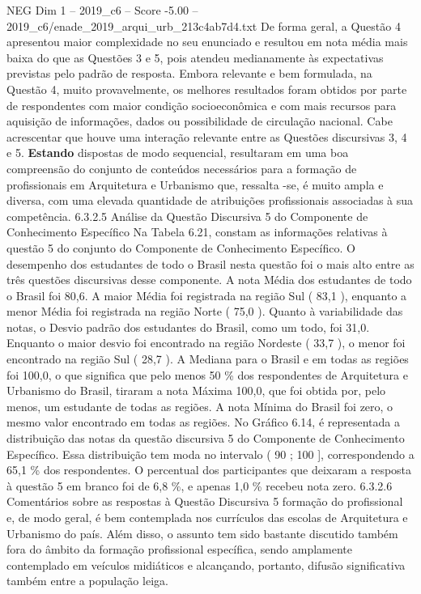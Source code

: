 \begin{textsample}{NEG Dim 1 – 2019\_c6 – Score -5.00 – 2019\_c6/enade\_2019\_arqui\_urb\_213c4ab7d4.txt}
De forma geral, a Questão 4 apresentou maior complexidade no seu enunciado e resultou em nota média mais baixa do que as Questões 3 e 5, pois atendeu medianamente às expectativas previstas pelo padrão de resposta.
Embora relevante e bem formulada, na Questão 4, muito provavelmente, os melhores resultados foram obtidos por parte de respondentes com maior condição socioeconômica e com mais recursos para aquisição de informações, dados ou possibilidade de circulação nacional.
Cabe acrescentar que houve uma interação relevante entre as Questões discursivas 3, 4 e 5. \textbf{Estando} dispostas de modo sequencial, resultaram em uma boa compreensão do conjunto de conteúdos necessários para a formação de profissionais em Arquitetura e Urbanismo que, ressalta -se, é muito ampla e diversa, com uma elevada quantidade de atribuições profissionais associadas à sua competência. 6.3.2.5 Análise da Questão Discursiva 5 do Componente de Conhecimento Específico Na Tabela 6.21, constam as informações relativas à questão 5 do conjunto do Componente de Conhecimento Específico.
O desempenho dos estudantes de todo o Brasil nesta questão foi o mais alto entre as três questões discursivas desse componente.
A nota Média dos estudantes de todo o Brasil foi 80,6.
A maior Média foi registrada na região Sul ( 83,1 ), enquanto a menor Média foi registrada na região Norte ( 75,0 ).
Quanto à variabilidade das notas, o Desvio padrão dos estudantes do Brasil, como um todo, foi 31,0.
Enquanto o maior desvio foi encontrado na região Nordeste ( 33,7 ), o menor foi encontrado na região Sul ( 28,7 ).
A Mediana para o Brasil e em todas as regiões foi 100,0, o que significa que pelo menos 50 \% dos respondentes de Arquitetura e Urbanismo do Brasil, tiraram a nota Máxima 100,0, que foi obtida por, pelo menos, um estudante de todas as regiões.
A nota Mínima do Brasil foi zero, o mesmo valor encontrado em todas as regiões.
No Gráfico 6.14, é representada a distribuição das notas da questão discursiva 5 do Componente de Conhecimento Específico.
Essa distribuição tem moda no intervalo ( 90 ; 100 ], correspondendo a 65,1 \% dos respondentes.
O percentual dos participantes que deixaram a resposta à questão 5 em branco foi de 6,8 \%, e apenas 1,0 \% recebeu nota zero. 6.3.2.6 Comentários sobre as respostas à Questão Discursiva 5 formação do profissional e, de modo geral, é bem contemplada nos currículos das escolas de Arquitetura e Urbanismo do país.
Além disso, o assunto tem sido bastante discutido também fora do âmbito da formação profissional específica, sendo amplamente contemplado em veículos midiáticos e alcançando, portanto, difusão significativa também entre a população leiga.

\end{textsample}
